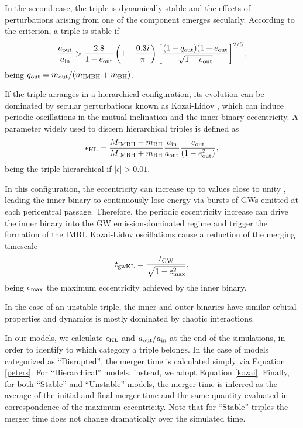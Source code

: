 \documentclass[twocolumn]{aastex62}
\newcommand{\gw}{{\rm GW}}
\newcommand{\kl}{{\rm KL}}
\newcommand{\imbh}{{\rm IMBH}}
\newcommand{\inn}{{\rm in}}
\newcommand{\out}{{\rm out}}
\newcommand{\bh}{{\rm BH}}
\begin{document}
In the second case, the triple is dynamically stable and the effects of perturbations arising from one of the component emerges secularly.  According to the \cite{mardling01} criterion, a triple is stable if
\begin{equation}
    \frac{a_\out}{a_\inn} > \frac{2.8}{1-e_\out}\left(1-\frac{0.3i}{\pi}\right)\left[\frac{(1+q_\out)(1+e_\out}{\sqrt{1-e_\out}}\right]^{2/5}, 
\label{stabcri}
\end{equation}
being $q_\out = m_\out/(m_\imbh + m_\bh)$.

If the triple arranges in a hierarchical configuration, its evolution can be dominated by secular perturbations known as Kozai-Lidov \citep{kozai62,lidov62}, which can induce periodic oscillations in the mutual inclination and the inner binary eccentricity. A parameter widely used to discern hierarchical triples is defined as \citep{Lithwick11,naoz11}
\begin{equation}
\epsilon_\kl = \frac{M_\imbh - m_\bh }{M_\imbh + m_\bh} \frac{a_{\inn}}{a_{\out}}\frac{e_{\out}}{(1-e_{\out}^2)},
\end{equation}
being the triple hierarchical if $|\epsilon| > 0.01$.

In this configuration, the eccentricity can increase up to values close to unity \citep{naoz11,naoz16}, leading the inner binary to continuously lose energy via bursts of GWs emitted at each pericentral passage. Therefore, the periodic eccentricity increase can drive the inner binary into the GW emission-dominated regime and trigger the formation of the IMRI. Kozai-Lidov oscillations cause a reduction of the merging timescale \citep[see for instance]{antonini12}
\begin{equation}
    t_{\rm gwKL} = \frac{t_\gw}{\sqrt{1-e_{\rm max}^2}},
\label{kozai}
\end{equation}
being $e_{\rm max}$ the maximum eccentricity achieved by the inner binary. 

In the case of an unstable triple, the inner and outer binaries have similar orbital properties and dynamics is mostly dominated by chaotic interactions.

In our models, we calculate $\epsilon_\kl$ and $a_\out/a_\inn$ at the end of the simulations, in order to identify to which category a triple belongs. 
In the case of models categorized as ``Disrupted'', the merger time is calculated simply via 
Equation \ref{peters}. For ``Hierarchical'' models, instead, we adopt Equation \ref{kozai}. Finally, for both ``Stable'' and ``Unstable'' models, the merger time is inferred as the average of the initial and final merger time and the same quantity evaluated in correspondence of the maximum eccentricity. Note that for ``Stable'' triples the merger time does not change dramatically over the simulated time.
\end{document}
